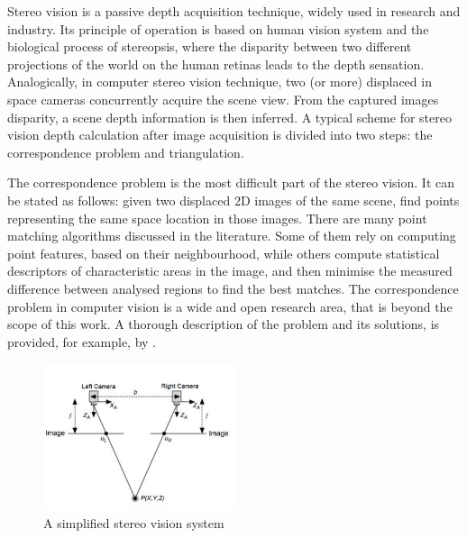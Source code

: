 Stereo vision is a passive depth acquisition technique, widely used in research and  industry. Its principle of operation is based on human vision system and the biological process of stereopsis, where the disparity between two different projections of the world on the human retinas leads to the depth sensation. Analogically, in computer stereo vision technique, two (or more) displaced in space cameras concurrently acquire the scene view. From the captured images disparity, a scene depth information is then inferred. A typical scheme for stereo vision depth calculation after image acquisition is divided into two steps: the correspondence problem and triangulation.

The correspondence problem is the most difficult part of the stereo vision. It can be stated as follows: given two displaced 2D images of the same scene, find points representing the same space location in those images. There are many point matching algorithms discussed in the literature. Some of them rely on computing point features, based on their neighbourhood, while others compute statistical descriptors of characteristic areas in the image, and then minimise the measured difference between analysed regions to find the best matches. The correspondence problem in computer vision is a wide and open research area, that is beyond the scope of this work. A thorough description of the problem and its solutions, is provided, for example, by \cite{Cyganek}.

\begin{figure}[H]
\label{fig:stereo}
\centering
\includegraphics[width=0.5\textwidth]{fig/nistereovision}
\caption{A simplified stereo vision system \cite{nistereo}}
\label{fig:stereovision}
\end{figure}



